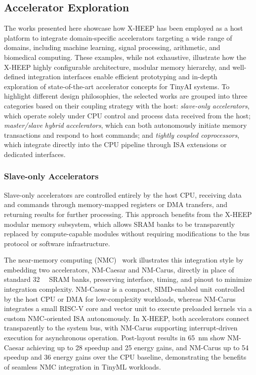         \subsection{Accelerator Exploration}
        
            The works presented here showcase how \mbox{X-HEEP} has been employed as a host platform to integrate domain-specific accelerators targeting a wide range of domains, including machine learning, signal processing, arithmetic, and biomedical computing. These examples, while not exhaustive, illustrate how the \mbox{X-HEEP} highly configurable architecture, modular memory hierarchy, and well-defined integration interfaces enable efficient prototyping and in-depth exploration of state-of-the-art accelerator concepts for TinyAI systems. To highlight different design philosophies, the selected works are grouped into three categories based on their coupling strategy with the host: \emph{slave-only accelerators}, which operate solely under CPU control and process data received from the host; \emph{master/slave hybrid accelerators}, which can both autonomously initiate memory transactions and respond to host commands; and \emph{tightly coupled coprocessors}, which integrate directly into the CPU pipeline through ISA extensions or dedicated interfaces.
            
            \subsubsection*{Slave-only Accelerators}
                
                Slave-only accelerators are controlled entirely by the host CPU, receiving data and commands through memory-mapped registers or DMA transfers, and returning results for further processing. This approach benefits from the \mbox{X-HEEP} modular memory subsystem, which allows SRAM banks to be transparently replaced by compute-capable modules without requiring modifications to the bus protocol or software infrastructure.
                
                The near-memory computing (NMC)~\cite{nmc} work illustrates this integration style by embedding two accelerators, NM-Caesar and NM-Carus, directly in place of standard \SI{32}{\kibi\byte} SRAM banks, preserving interface, timing, and pinout to minimize integration complexity. NM-Caesar is a compact, SIMD-enabled unit controlled by the host CPU or DMA for low-complexity workloads, whereas NM-Carus integrates a small RISC-V core and vector unit to execute preloaded kernels via a custom NMC-oriented ISA autonomously. In \mbox{X-HEEP}, both accelerators connect transparently to the system bus, with NM-Carus supporting interrupt-driven execution for asynchronous operation. Post-layout results in \SI{65}{\nano\meter} show NM-Caesar achieving up to \SI{28}{\times} speedup and \SI{25}{\times} energy gains, and NM-Carus up to \SI{54}{\times} speedup and \SI{36}{\times} energy gains over the CPU baseline, demonstrating the benefits of seamless NMC integration in TinyML workloads.
                
